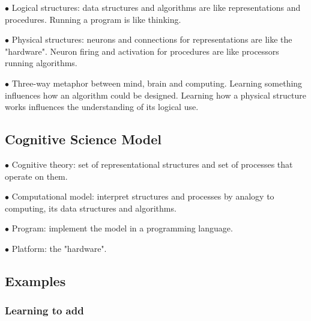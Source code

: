 \documentclass[english,openany]{book}
\begin{document}
$\bullet$ Logical structures: data structures and algorithms are like representations and procedures. Running a program is like thinking.

$\bullet$ Physical structures: neurons and connections for representations are like the "hardware". Neuron firing and activation for procedures are like processors running algorithms.

$\bullet$ Three-way metaphor between mind, brain and computing. Learning something influences how an algorithm could be designed. Learning how a physical structure works influences the understanding of its logical use.

\subsection{Cognitive Science Model}

$\bullet$ Cognitive theory: set of representational structures and set of processes that operate on them.

$\bullet$ Computational model: interpret structures and processes by analogy to computing, its data structures and algorithms.

$\bullet$ Program: implement the model in a programming language.

$\bullet$ Platform: the "hardware".

\subsection{Examples}

\subsubsection{Learning to add}
\end{document}
